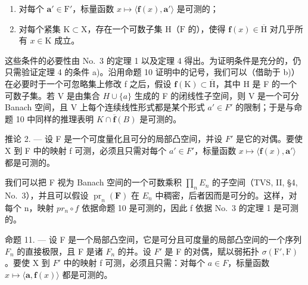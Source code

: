 \begin{enumerate}
\def\labelenumi{\alph{enumi})}
\tightlist
\item
  对每个 \(\mathbf{a}' \in \mathrm{F}'\)，标量函数 \(x \mapsto \langle \mathbf{f}(x), \mathbf{a}' \rangle\) 是可测的；
\item
  对每个紧集 \(\mathrm{K} \subset \mathrm{X}\)，存在一个可数子集 \(\mathrm{H}\)（\(\mathrm{F}\) 的），使得 \(\mathbf{f}(x) \in \overline{\mathrm{H}}\) 对几乎所有 \(x \in \mathrm{K}\) 成立。
\end{enumerate}

这些条件的必要性由 No.~3 的定理 1 以及定理 4 得出。为证明条件是充分的，仍只需验证定理 4 的条件 a)。沿用命题 10 证明中的记号，我们可以（借助于 b)）在必要时于一个可忽略集上修改 f 之后，假设 \(\mathbf{f}(\mathrm{K}) \subset \overline{\mathrm{H}}\)，其中 H 是 F 的一个可数子集。若 V 是由集合 \(H \cup \{a\}\) 生成的 F 的闭线性子空间，则 V 是一个可分 Banach 空间，且 V 上每个连续线性形式都是某个形式 \(a' \in F'\) 的限制；于是与命题 10 中同样的推理表明 \(K \cap \overline{\mathbf{f}}(B)\) 是可测的。

推论 2. --- 设 F 是一个可度量化且可分的局部凸空间，并设 \(F'\) 是它的对偶。要使 X 到 F 中的映射 f 可测，必须且只需对每个 \(a' \in F'\)，标量函数 \(x \mapsto \langle \mathbf{f}(x), \mathbf{a}' \rangle\) 都是可测的。

我们可以把 F 视为 Banach 空间的一个可数乘积 \(\prod_{n}E_{n}\) 的子空间（TVS, II, §4, No.~3），并且可以假设 \(\operatorname{pr}_{n}(\mathbf{F})\) 在 \(E_{n}\) 中稠密，后者因而是可分的。这样，对每个 n，映射 \(pr_{n}\circ f\) 依据命题 10 是可测的，因此 f 依据 No.~3 的定理 1 是可测的。

命题 11. --- 设 F 是一个局部凸空间，它是可分且可度量的局部凸空间的一个序列 \(F_{n}\) 的直接极限，且 F 是诸 \(F_{n}\) 的并。设 \(F'\) 是 F 的对偶，赋以弱拓扑 \(\sigma(\mathrm{F}',\mathrm{F})\)。要使 X 到 \(F'\) 中的映射 f 可测，必须且只需：对每个 \(a \in F\)，标量函数 \(x \mapsto \langle \mathbf{a}, \mathbf{f}(x) \rangle\) 都是可测的。

